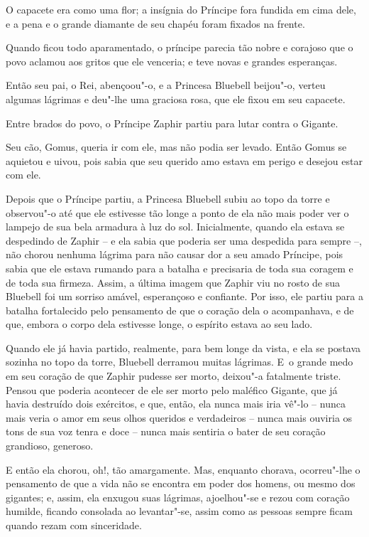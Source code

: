 O capacete era como uma flor; a insígnia do Príncipe fora fundida em
cima dele, e a pena e o grande diamante de seu chapéu foram fixados na
frente.

Quando ficou todo aparamentado, o príncipe parecia tão nobre e corajoso
que o povo aclamou aos gritos que ele venceria; e teve novas e grandes
esperanças.

Então seu pai, o Rei, abençoou"-o, e a Princesa Bluebell beijou"-o, verteu
algumas lágrimas e deu"-lhe uma graciosa rosa, que ele fixou em seu
capacete.

Entre brados do povo, o Príncipe Zaphir partiu para lutar contra o
Gigante.

Seu cão, Gomus, queria ir com ele, mas não podia ser levado. Então Gomus
se aquietou e uivou, pois sabia que seu querido amo estava em perigo e
desejou estar com ele.

Depois que o Príncipe partiu, a Princesa Bluebell subiu ao topo da torre
e observou"-o até que ele estivesse tão longe a ponto de ela não mais
poder ver o lampejo de sua bela armadura à luz do sol. Inicialmente,
quando ela estava se despedindo de Zaphir -- e ela sabia que poderia ser
uma despedida para sempre --, não chorou nenhuma lágrima para não causar
dor a seu amado Príncipe, pois sabia que ele estava rumando para a
batalha e precisaria de toda sua coragem e de toda sua firmeza. Assim, a
última imagem que Zaphir viu no rosto de sua Bluebell foi um sorriso
amável, esperançoso e confiante. Por isso, ele partiu para a batalha
fortalecido pelo pensamento de que o coração dela o acompanhava, e de
que, embora o corpo dela estivesse longe, o espírito estava ao seu lado.

Quando ele já havia partido, realmente, para bem longe da vista, e ela
se postava sozinha no topo da torre, Bluebell derramou muitas lágrimas.
E~o grande medo em seu coração de que Zaphir pudesse ser morto, deixou"-a
fatalmente triste. Pensou que poderia acontecer de ele ser morto pelo
maléfico Gigante, que já havia destruído dois exércitos, e que, então,
ela nunca mais iria vê"-lo -- nunca mais veria o amor em seus olhos
queridos e verdadeiros -- nunca mais ouviria os tons de sua voz tenra e
doce -- nunca mais sentiria o bater de seu coração grandioso, generoso.

E então ela chorou, oh!, tão amargamente. Mas, enquanto chorava,
ocorreu"-lhe o pensamento de que a vida não se encontra em poder dos
homens, ou mesmo dos gigantes; e, assim, ela enxugou suas lágrimas,
ajoelhou"-se e rezou com coração humilde, ficando consolada ao
levantar"-se, assim como as pessoas sempre ficam quando rezam com
sinceridade.

